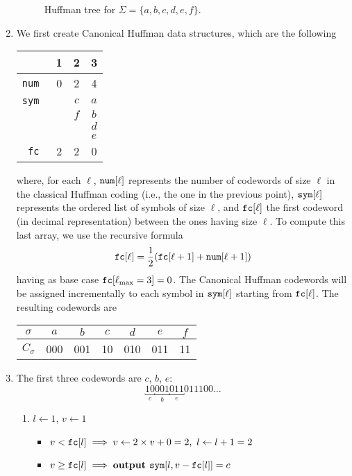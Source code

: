 \begin{enumerate}
\begin{figure}[t]
    \caption{Huffman tree for $\Sigma = \{ a, b, c, d, e, f \}$.}

    \label{fig:huffman-tree}
  \end{figure}

  \item We first create Canonical Huffman data structures, which are the
  following
  \begin{center}
    \begin{tabular}{|r||c|c|c|}
      \multicolumn{1}{r}{} & \multicolumn{1}{c}{\tiny 1} & \multicolumn{1}{c}{\tiny 2} & \multicolumn{1}{c}{\tiny 3} \\ \hline
      \tt num & 0 & 2 & 4 \\ \hline
      \tt sym &   & $c$ & $a$ \\
              & & $f$ & $b$ \\
              & & & $d$ \\
              & & & $e$ \\ \hline
      \tt fc  & 2 & 2 & 0 \\ \hline
    \end{tabular}
  \end{center}
  where, for each $\ell$, $\text{\tt num}[\ell]$ represents the number of
  codewords of size $\ell$ in the classical Huffman coding (i.e., the one in the
  previous point), $\text{\tt sym}[\ell]$ represents the ordered list of symbols
  of size $\ell$, and $\text{\tt fc}[\ell]$ the first codeword (in decimal
  representation) between the ones having size $\ell$. To compute this last
  array, we use the recursive formula $$\text{\tt fc}[\ell] =
  \frac{1}{2}(\text{\tt fc}[\ell + 1] + \text{\tt num}[\ell + 1])$$ having as
  base case $\text{\tt fc}[\ell_\text{max} = 3] = 0$. The Canonical Huffman
  codewords will be assigned incrementally to each symbol in $\text{\tt
  sym}[\ell]$ starting from $\text{\tt fc}[\ell]$. The resulting codewords are
  \begin{center}
    \begin{tabular}{c||c|c|c|c|c|c}
    $\sigma$ &  $a$ & $b$ & $c$ & $d$ & $e$ & $f$ \\\hline
    $C_\sigma$ &  000 & 001 & 10 & 010 & 011 & 11 \\
    \end{tabular}
  \end{center}

  \item The first three codewords are $c$, $b$, $e$:
  $$\underbracket{10}_c\underbracket{001}_b\underbracket{011}_e011100\dots$$
  \begin{enumerate}
    \item $l \gets 1$, $v \gets 1$
    \begin{itemize}
      \item $v < \text{\tt fc}[l] \implies v \gets 2 \times v + 0 = 2,\ l \gets l + 1 = 2$
      \item $v \ge \text{\tt fc}[l] \implies \text{\bf output \tt sym}[l, v - \text{\tt fc}[l]] = c$
    \end{itemize}


\end{enumerate}
\end{enumerate}
